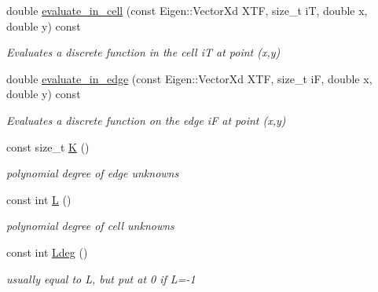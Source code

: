\begin{DoxyCompactItemize}
\mbox{\label{classHArDCore2D_1_1HybridCore_a58dd478934c1f5b65ae8b7df31e8ead4}} 
double \hyperlink{classHArDCore2D_1_1HybridCore_a58dd478934c1f5b65ae8b7df31e8ead4}{evaluate\+\_\+in\+\_\+cell} (const Eigen\+::\+Vector\+Xd X\+TF, size\+\_\+t iT, double x, double y) const
\begin{DoxyCompactList}\small\item\em Evaluates a discrete function in the cell iT at point (x,y) \end{DoxyCompactList}\item 
\mbox{\label{classHArDCore2D_1_1HybridCore_ae6795e8bc0058be7e399b379333032c8}} 
double \hyperlink{classHArDCore2D_1_1HybridCore_ae6795e8bc0058be7e399b379333032c8}{evaluate\+\_\+in\+\_\+edge} (const Eigen\+::\+Vector\+Xd X\+TF, size\+\_\+t iF, double x, double y) const
\begin{DoxyCompactList}\small\item\em Evaluates a discrete function on the edge iF at point (x,y) \end{DoxyCompactList}\item 
\mbox{\label{classHArDCore2D_1_1HybridCore_a74242d0a8b68fe5d9a35c6eb0effe3b2}} 
const size\+\_\+t \hyperlink{classHArDCore2D_1_1HybridCore_a74242d0a8b68fe5d9a35c6eb0effe3b2}{K} ()
\begin{DoxyCompactList}\small\item\em polynomial degree of edge unknowns \end{DoxyCompactList}\item 
\mbox{\label{classHArDCore2D_1_1HybridCore_af5aea2e23e91c582d8c8189a5bc7ae96}} 
const int \hyperlink{classHArDCore2D_1_1HybridCore_af5aea2e23e91c582d8c8189a5bc7ae96}{L} ()
\begin{DoxyCompactList}\small\item\em polynomial degree of cell unknowns \end{DoxyCompactList}\item 
\mbox{\label{classHArDCore2D_1_1HybridCore_abc772d1adc056fb4bf725f39c92edbb5}} 
const int \hyperlink{classHArDCore2D_1_1HybridCore_abc772d1adc056fb4bf725f39c92edbb5}{Ldeg} ()
\begin{DoxyCompactList}\small\item\em usually equal to L, but put at 0 if L=-\/1 \end{DoxyCompactList}\item 

\end{DoxyCompactItemize}
